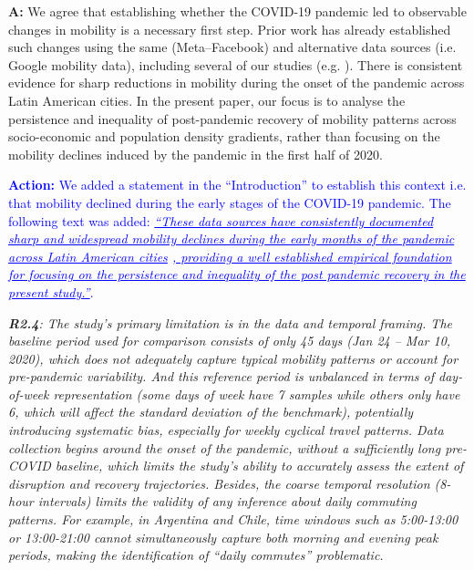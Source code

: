 \documentclass[12pt,a4paper,oneside, reqno]{amsart}
\begin{document}
\setlength{\leftskip}{1cm}\textbf{A:}  We agree that establishing whether the COVID-19 pandemic led to observable changes in mobility is a necessary first step. Prior work has already established such changes using the same (Meta–Facebook) and alternative data sources (i.e. Google mobility data), including several of our studies (e.g. \parencite{rowe2023a, covidMexico24, demography25}). There is consistent evidence for sharp reductions in mobility during the onset of the pandemic across Latin American cities. In the present paper, our focus is to analyse the persistence and inequality of post-pandemic recovery of mobility patterns across socio-economic and population density gradients, rather than focusing on the mobility declines induced by the pandemic in the first half of 2020.

\textcolor{blue}{
\textbf{Action:} We added a statement in the ``Introduction'' to establish this context i.e. that mobility declined during the early stages of the COVID-19 pandemic. The following text was added: \textit{\uline{``These data sources have consistently documented sharp and widespread mobility declines during the early months of the pandemic across Latin American cities} \parencite{RoweCCA24, covidMexico24, elejalde2024, demography25}\uline{, providing a well established empirical foundation for focusing on the persistence and inequality of the post pandemic recovery in the present study.''}}.
}

\setlength{\leftskip}{0cm} \textit{\textbf{R2.4}: The study’s primary limitation is in the data and temporal framing. The baseline period used for comparison consists of only 45 days (Jan 24 – Mar 10, 2020), which does not adequately capture typical mobility patterns or account for pre-pandemic variability. And this reference period is unbalanced in terms of day-of-week representation (some days of week have 7 samples while others only have 6, which will affect the standard deviation of the benchmark), potentially introducing systematic bias, especially for weekly cyclical travel patterns. Data collection begins around the onset of the pandemic, without a sufficiently long pre-COVID baseline, which limits the study’s ability to accurately assess the extent of disruption and recovery trajectories. Besides, the coarse temporal resolution (8-hour intervals) limits the validity of any inference about daily commuting patterns. For example, in Argentina and Chile, time windows such as 5:00-13:00 or 13:00-21:00 cannot simultaneously capture both morning and evening peak periods, making the identification of ``daily commutes'' problematic.}
 
\end{document}
